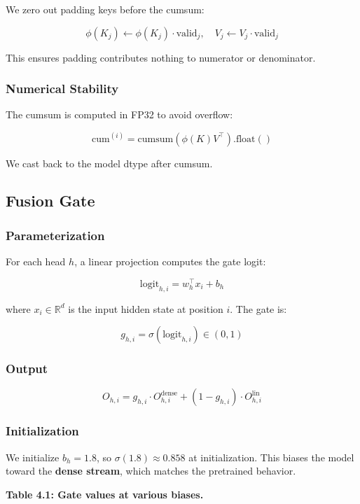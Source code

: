 We zero out padding keys before the cumsum:

\[
\phi(K_j) \leftarrow \phi(K_j) \cdot \text{valid}_j, \quad
V_j \leftarrow V_j \cdot \text{valid}_j
\]

This ensures padding contributes nothing to numerator or denominator.

\subsubsection{Numerical Stability}

The cumsum is computed in FP32 to avoid overflow:

\[
\text{cum}^{(i)} = \text{cumsum}(\phi(K) V^\top).\text{float}()
\]

We cast back to the model dtype after cumsum.

\subsection{Fusion Gate}

\subsubsection{Parameterization}

For each head $h$, a linear projection computes the gate logit:

\[
\text{logit}_{h,i} = w_h^\top x_i + b_h
\]

where $x_i \in \mathbb{R}^d$ is the input hidden state at position $i$. The 
gate is:

\[
g_{h,i} = \sigma(\text{logit}_{h,i}) \in (0, 1)
\]

\subsubsection{Output}

\[
O_{h,i} = g_{h,i} \cdot O^\text{dense}_{h,i} + (1 - g_{h,i}) \cdot O^\text{lin}_{h,i}
\]

\subsubsection{Initialization}

We initialize $b_h = 1.8$, so $\sigma(1.8) \approx 0.858$ at initialization. 
This biases the model toward the \textbf{dense stream}, which matches the 
pretrained behavior.

\textbf{Table 4.1: Gate values at various biases.}

